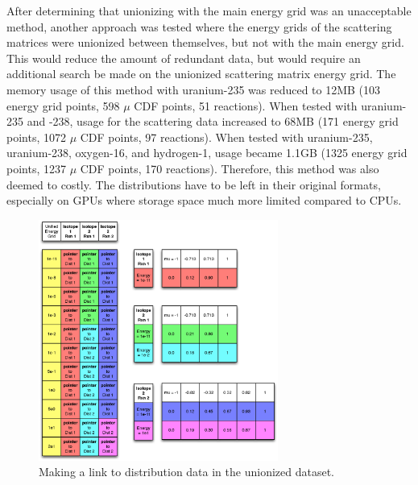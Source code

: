 After determining that unionizing with the main energy grid was an unacceptable method, another approach was tested where the energy grids of the scattering matrices were unionized between themselves, but not with the main energy grid.  This would reduce the amount of redundant data, but would require an additional search be made on the unionized scattering matrix energy grid.  The memory usage of this method with uranium-235 was reduced to 12MB (103 energy grid points, 598 $\mu$ CDF points, 51 reactions).  When tested with uranium-235 and -238, usage for the scattering data increased to 68MB (171 energy grid points, 1072 $\mu$ CDF points, 97 reactions).  When tested with uranium-235, uranium-238, oxygen-16, and hydrogen-1, usage became 1.1GB (1325 energy grid points, 1237 $\mu$ CDF points, 170 reactions).  Therefore, this method was also deemed to costly.  The distributions have to be left in their original formats, especially on GPUs where storage space much more limited compared to CPUs.


\begin{figure}[h!] 
\centering
\includegraphics[width=0.7\textwidth]{graphics/unionized_pointers.eps}
\caption{Making a link to distribution data in the unionized dataset. \label{unionized_pointers} }
\end{figure}


